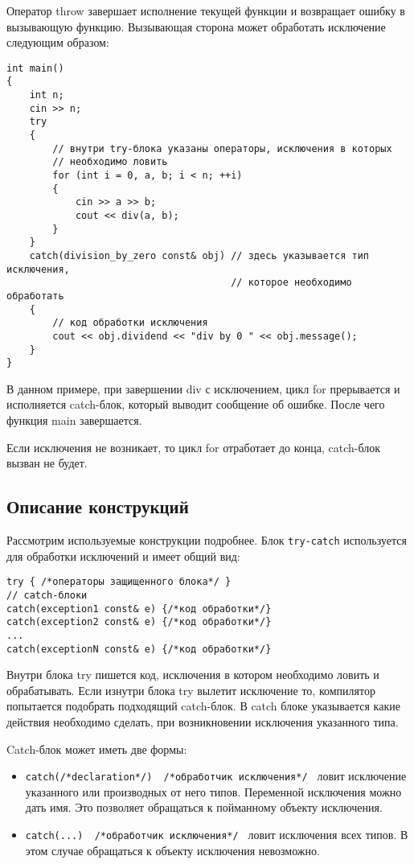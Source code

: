 Оператор throw завершает исполнение текущей функции и возвращает ошибку в вызывающую функцию. Вызывающая сторона может обработать исключение следующим образом:

\begin{verbatim}
int main()
{
    int n;
    cin >> n;
    try
    {
        // внутри try-блока указаны операторы, исключения в которых
        // необходимо ловить
        for (int i = 0, a, b; i < n; ++i)
        {
            cin >> a >> b;
            cout << div(a, b);
        }
    }
    catch(division_by_zero const& obj) // здесь указывается тип исключения,
                                       // которое необходимо обработать
    {
        // код обработки исключения
        cout << obj.dividend << "div by 0 " << obj.message();
    }
}
\end{verbatim}

В данном примере, при завершении div с исключением, цикл for прерывается и исполняется catch-блок, который выводит сообщение об ошибке. После чего функция main завершается.

Если исключения не возникает, то цикл for отработает до конца, catch-блок вызван не будет.

\subsection{Описание конструкций}
Рассмотрим используемые конструкции подробнее. Блок \texttt{try-catch} используется для обработки исключений и имеет общий вид:
\begin{verbatim}
try { /*операторы защищенного блока*/ }
// catch-блоки
catch(exception1 const& e) {/*код обработки*/}
catch(exception2 const& e) {/*код обработки*/}
...
catch(exceptionN const& e) {/*код обработки*/}
\end{verbatim}
Внутри блока try пишется код, исключения в котором необходимо ловить и обрабатывать. Если изнутри блока try вылетит исключение то, компилятор попытается подобрать подходящий catch-блок. В catch блоке указывается какие действия необходимо сделать, при возникновении исключения указанного типа.

Catch-блок может иметь две формы:
\begin{itemize}
    \item
    \texttt{catch(/*declaration*/) { /*обработчик исключения*/ }} ловит исключение указанного или производных от него типов. Переменной исключения можно дать имя. Это позволяет обращаться к пойманному объекту исключения.
    \item
    \texttt{catch(...) { /*обработчик исключения*/ }}
    ловит исключения всех типов. В этом случае обращаться к объекту исключения невозможно.
\end{itemize}

